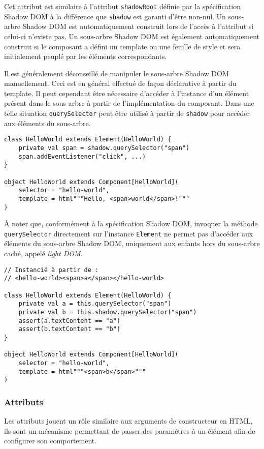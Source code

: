 Cet attribut est similaire à l'attribut \texttt{shadowRoot} définie par la spécification Shadow DOM à la différence que \texttt{shadow} est garanti d'être non-nul. Un sous-arbre Shadow DOM est automatiquement construit lors de l'accès à l'attribut si celui-ci n'existe pas. Un sous-arbre Shadow DOM est également automatiquement construit si le composant a défini un template ou une feuille de style et sera initialement peuplé par les éléments correspondants.

Il est généralement déconseillé de manipuler le sous-arbre Shadow DOM manuellement. Ceci est en général effectué de façon déclarative à partir du template. Il peut cependant être nécessaire d'accéder à l'instance d'un élément présent dans le sous arbre à partir de l'implémentation du composant. Dans une telle situation \texttt{querySelector} peut être utilisé à partir de \texttt{shadow} pour accéder aux éléments du sous-arbre.

\begin{lstlisting}
class HelloWorld extends Element(HelloWorld) {
	private val span = shadow.querySelector("span")
	span.addEventListener("click", ...)
}

object HelloWorld extends Component[HelloWorld](
	selector = "hello-world",
	template = html"""Hello, <span>world</span>!"""
)
\end{lstlisting}

À noter que, conformément à la spécification Shadow DOM, invoquer la méthode \texttt{querySelector} directement sur l'instance \texttt{Element} ne permet pas d'accéder aux éléments du sous-arbre Shadow DOM, uniquement aux enfants hors du sous-arbre caché, appelé \emph{light DOM}.

\begin{lstlisting}
// Instancié à partir de :
// <hello-world><span>a</span></hello-world>

class HelloWorld extends Element(HelloWorld) {
	private val a = this.querySelector("span")
	private val b = this.shadow.querySelector("span")
	assert(a.textContent == "a")
	assert(b.textContent == "b")
}

object HelloWorld extends Component[HelloWorld](
	selector = "hello-world",
	template = html"""<span>b</span>"""
)
\end{lstlisting}

\subsubsection{Attributs}
Les attributs jouent un rôle similaire aux arguments de constructeur en HTML, ils sont un mécanisme permettant de passer des paramètres à un élément afin de configurer son comportement.

